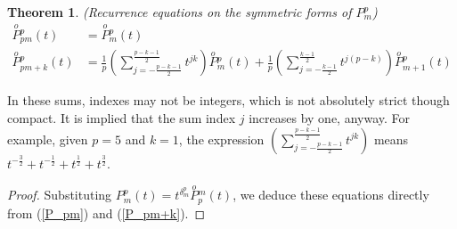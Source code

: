 \documentclass[a4paper]{article}
\theoremstyle{plain}
\newtheorem{theorem}{Theorem}[section]
\theoremstyle{definition}
\newcommand{\SymPol}[2]{\overset{o}{P}{}^{#1}_{#2}}
\begin{document}
\begin{theorem}(Recurrence equations on the symmetric forms of $P_m^p$)
\begin{align}
    \SymPol{p}{pm}(t)&=\SymPol{p}{m}(t)\\
    \SymPol{p}{pm+k}(t)&=\frac{1}{p}\left(\sum\limits_{j=-\frac{p-k-1}{2}}^{\frac{p-k-1}{2}} t^{jk}\right)\SymPol{p}{m}(t)+\frac{1}{p}\left(\sum\limits_{j=-\frac{k-1}{2}}^\frac{k-1}{2} t^{j(p-k)}\right)\SymPol{p}{m+1}(t)
\end{align}
\end{theorem}
In these sums, indexes may not be integers, which is not absolutely strict though compact. It is implied that the sum index $j$ increases by one, anyway. For example, given $p=5$ and $k=1$, the expression $\left(\sum\limits_{j=-\frac{p-k-1}{2}}^{\frac{p-k-1}{2}} t^{jk}\right)$ means $t^{-\frac{3}{2}} + t^{-\frac{1}{2}} + t^{\frac{1}{2}} +  t^{\frac{3}{2}}$.
\begin{proof} Substituting $P_m^p(t) = t^{\delta_m^p}\SymPol{m}{p}(t)$, we deduce these equations directly from (\ref{P_pm}) and (\ref{P_pm+k}).
\end{proof}
\newpage

\end{document}
